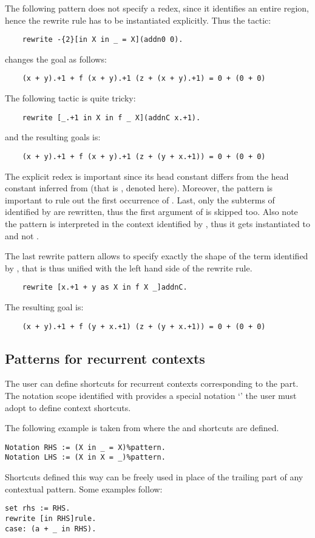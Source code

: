 The following pattern does not specify a redex, since it
identifies an entire region, hence the rewrite rule has to be instantiated
explicitly. Thus the tactic:
\begin{lstlisting}
    rewrite -{2}[in X in _ = X](addn0 0).
\end{lstlisting}
changes the goal as follows:
\begin{lstlisting}
    (x + y).+1 + f (x + y).+1 (z + (x + y).+1) = 0 + (0 + 0)
\end{lstlisting}
The following tactic is quite tricky:
\begin{lstlisting}
    rewrite [_.+1 in X in f _ X](addnC x.+1).
\end{lstlisting}
and the resulting goals is:
\begin{lstlisting}
    (x + y).+1 + f (x + y).+1 (z + (y + x.+1)) = 0 + (0 + 0)
\end{lstlisting}
The explicit redex  is important since its head
constant  differs from the head constant inferred from
 (that is , denoted \C{+} here).
Moreover, the pattern  is important to rule out the first occurrence
of . Last, only the subterms of  identified by  are
rewritten, thus the first argument of  is skipped too.
Also note the pattern  is interpreted in the context
identified by , thus it gets instantiated to  and
not .

The last rewrite pattern allows to specify exactly the shape of the term
identified by , that is thus unified with the left hand side of the
rewrite rule.
\begin{lstlisting}
    rewrite [x.+1 + y as X in f X _]addnC.
\end{lstlisting}
The resulting goal is:
\begin{lstlisting}
    (x + y).+1 + f (y + x.+1) (z + (y + x.+1)) = 0 + (0 + 0)
\end{lstlisting}

\subsection{Patterns for recurrent contexts}

The user can define shortcuts for recurrent contexts corresponding to the
 part. The notation scope identified
with  provides a special notation `' the user
must adopt to define context shortcuts.

The following example is taken from  where the
 and  shortcuts are defined.

\begin{lstlisting}
Notation RHS := (X in _ = X)%pattern.
Notation LHS := (X in X = _)%pattern.
\end{lstlisting}

Shortcuts defined this way can be freely used in place of the
trailing  part of any contextual
pattern.
Some examples follow:

\begin{lstlisting}
set rhs := RHS.
rewrite [in RHS]rule.
case: (a + _ in RHS).
\end{lstlisting}
